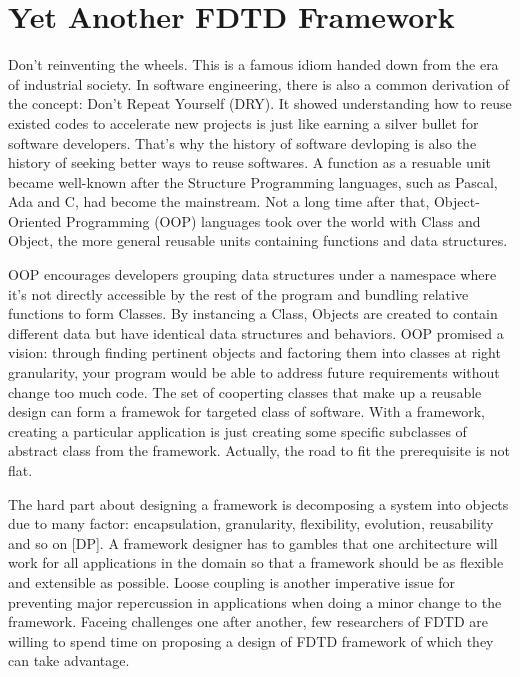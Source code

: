\section{Yet Another FDTD Framework}

Don't reinventing the wheels. This is a famous idiom handed down from the era of industrial society. In software
engineering, there is also a common derivation of the concept: Don't Repeat Yourself (DRY). It showed understanding how
to reuse existed codes to accelerate new projects is just like earning a silver bullet for software developers. That's
why the history of software devloping is also the history of seeking better ways to reuse softwares. A function as a
resuable unit became well-known after the Structure Programming languages, such as Pascal, Ada and C, had become the
mainstream. Not a long time after that, Object-Oriented Programming (OOP) languages took over the world with Class and
Object, the more general reusable units containing functions and data structures.

OOP encourages developers grouping data structures under a namespace where it's not directly accessible by the rest of
the program and bundling relative functions to form Classes. By instancing a Class, Objects are created to contain
different data but have identical data structures and behaviors. OOP promised a vision: through finding pertinent
objects and factoring them into classes at right granularity, your program would be able to address future requirements
without change too much code. The set of cooperting classes that make up a reusable design can form a framewok for
targeted class of software. With a framework, creating a particular application is just creating some specific
subclasses of abstract class from the framework. Actually, the road to fit the prerequisite is not flat.

The hard part about designing a framework is decomposing a system into objects due to many factor: encapsulation,
granularity, flexibility, evolution, reusability and so on [DP]. A framework designer has to gambles that one
architecture will work for all applications in the domain so that a framework should be as flexible and extensible as
possible. Loose coupling is another imperative issue for preventing major repercussion in applications when doing a
minor change to the framework. Faceing challenges one after another, few researchers of FDTD are willing to spend time
on proposing a design of FDTD framework of which they can take advantage.

